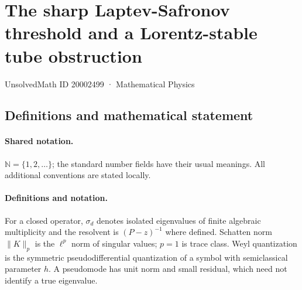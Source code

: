 \documentclass[11pt]{article}
\begin{document}
\setcounter{section}{20002498}
\section{The sharp Laptev-Safronov threshold and a Lorentz-stable tube obstruction}\label{20002499}
{\small UnsolvedMath ID 20002499 · Mathematical Physics}
\subsection{Definitions and mathematical statement}

\paragraph{Shared notation.}$\mathbb N=\{1,2,\ldots\}$; the standard number fields have their usual meanings. All additional conventions are stated locally.


\paragraph{Definitions and notation.}For a closed operator, $\sigma_d$ denotes isolated eigenvalues of finite algebraic multiplicity and the resolvent is $(P-z)^{-1}$ where defined. Schatten norm $\|K\|_p$ is the $\ell^p$ norm of singular values; $p=1$ is trace class. Weyl quantization is the symmetric pseudodifferential quantization of a symbol with semiclassical parameter $h$. A pseudomode has unit norm and small residual, which need not identify a true eigenvalue.
\end{document}
